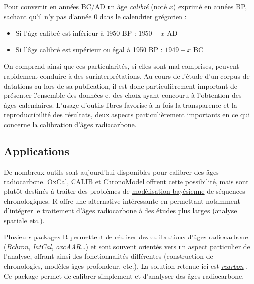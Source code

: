 \documentclass[
  french,
]{scrbook}
\providecommand{\tightlist}{%
  \setlength{\itemsep}{0pt}\setlength{\parskip}{0pt}}
\begin{document}
\begin{tcolorbox}[fonttitle=\sffamily\bfseries\large,title=Conseil,colframe=darkcyan]

Pour convertir en années BC/AD un âge \emph{calibré} (noté \(x\)) exprimé en années BP, sachant qu'il n'y pas d'année 0 dans le calendrier grégorien :

\begin{itemize}
\tightlist
\item
  Si l'âge calibré est inférieur à 1950 BP : \(1950 - x\) AD
\item
  Si l'âge calibré est supérieur ou égal à 1950 BP : \(1949 - x\) BC
\end{itemize}

\end{tcolorbox}

On comprend ainsi que ces particularités, si elles sont mal comprises, peuvent rapidement conduire à des surinterprétations. Au cours de l'étude d'un corpus de datations ou lors de sa publication, il est donc particulièrement important de présenter l'ensemble des données et des choix ayant concouru à l'obtention des âges calendaires. L'usage d'outils libres favorise à la fois la transparence et la reproductibilité des résultats, deux aspects particulièrement importants en ce qui concerne la calibration d'âges radiocarbone.

\hypertarget{applications}{%
\subsection{Applications}\label{applications}}

De nombreux outils sont aujourd'hui disponibles pour calibrer des âges radiocarbone. \href{https://c14.arch.ox.ac.uk/oxcal/}{OxCal}, \href{http://calib.org}{CALIB} et \href{https://chronomodel.com}{ChronoModel} offrent cette possibilité, mais sont plutôt destinés à traiter des problèmes de \href{https://fr.wikipedia.org/wiki/Statistique_bay\%C3\%A9sienne}{modélisation bayésienne} de séquences chronologiques. R offre une alternative intéressante en permettant notamment d'intégrer le traitement d'âges radiocarbone à des études plus larges (analyse spatiale etc.).

Plusieurs packages R permettent de réaliser des calibrations d'âges radiocarbone (\href{https://cran.r-project.org/package=Bchron}{\emph{Bchron}}, \href{https://cran.r-project.org/package=IntCal}{\emph{IntCal}}, \href{https://cran.r-project.org/package=oxcAAR}{\emph{oxcAAR}}\ldots) et sont souvent orientés vers un aspect particulier de l'analyse, offrant ainsi des fonctionnalités différentes (construction de chronologies, modèles âges-profondeur, etc.). La solution retenue ici est \href{https://cran.r-project.org/package=rcarbon}{\emph{rcarbon}} \autocite{R-rcarbon}. Ce package permet de calibrer simplement et d'analyser des âges radiocarbone.
\end{document}
